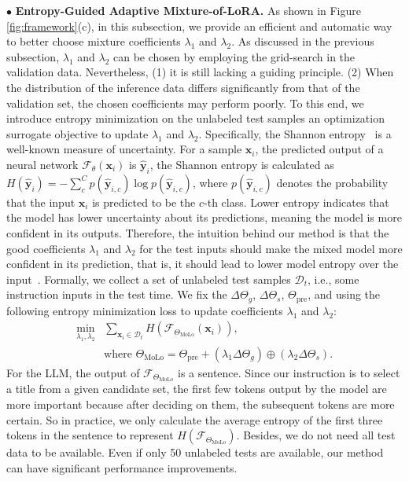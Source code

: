 \noindent$\bullet$ \quad\textbf{Entropy-Guided Adaptive Mixture-of-LoRA.}
As shown in Figure \ref{fig:framework}(c), in this subsection, we provide an efficient and automatic way to better choose mixture coefficients $\lambda_1$ and $\lambda_2$. As discussed in the previous subsection, $\lambda_1$ and $\lambda_2$ can be chosen by employing the grid-search in the validation data. Nevertheless, (1) it is still lacking a guiding principle. (2) When the distribution of the inference data differs significantly from that of the validation set, the chosen coefficients may perform poorly.
To this end, we introduce entropy minimization on the unlabeled test samples an optimization surrogate objective to update $\lambda_1$ and $\lambda_2$.
Specifically, the Shannon entropy~\cite{shannon1948mathematical} is a well-known measure of uncertainty. For a sample $\mathbf{x}_i$, the predicted output of a neural network $\mathcal{F}_\theta(\mathbf{x}_i)$ is $\hat{\mathbf{y}}_i$, the Shannon entropy is calculated as $H(\hat{\mathbf{y}}_i) = -\sum_c^C p\left(\hat{\mathbf{y}}_{i, c}\right) \log p\left(\hat{\mathbf{y}}_{i, c}\right)$, where $p\left(\hat{\mathbf{y}}_{i, c}\right)$ denotes the probability that the input $\mathbf{x}_i$ is predicted to be the $c$-th class. 
Lower entropy indicates that the model has lower uncertainty about its predictions, meaning the model is more confident in its outputs. 
Therefore, the intuition behind our method is that the good coefficients $\lambda_1$ and $\lambda_2$ for the test inputs should make the mixed model more confident in its prediction, that is, it should lead to lower model entropy over the input~\cite{wang2021tent,wang2021emea,yang2024adamerging}.
Formally, we collect a set of unlabeled test samples $\mathcal{D}_t$, i.e., some instruction inputs in the test time. We fix the $\Delta\Theta_g$, $\Delta\Theta_s$, $\Theta_\text{pre}$, and using the following entropy minimization loss to update coefficients $\lambda_1$ and $\lambda_2$:
\begin{align}
\min _{\lambda_1, \lambda_2} 
& \sum_{\mathbf{x}_i \in \mathcal{D}_t} 
H\left(\mathcal{F}_{\Theta_\text{MoLo}}\left(\mathbf{x}_i\right)\right), \\
& \text{where } \Theta_{\text{MoLo}} = 
\Theta_{\text{pre}} + (\lambda_1\Delta\Theta_g) \oplus (\lambda_2\Delta\Theta_s).
\end{align}
For the LLM, the output of $\mathcal{F}_{\Theta_\text{MoLo}}$ is a sentence. Since our instruction is to select a title from a given candidate set, the first few tokens output by the model are more important because after deciding on them, the subsequent tokens are more certain.
So in practice, we only calculate the average entropy of the first three tokens in the sentence to represent $H\left(\mathcal{F}_{\Theta_\text{MoLo}}\right)$.
Besides, we do not need all test data to be available. Even if only 50 unlabeled tests are available, our method can have significant performance improvements.


